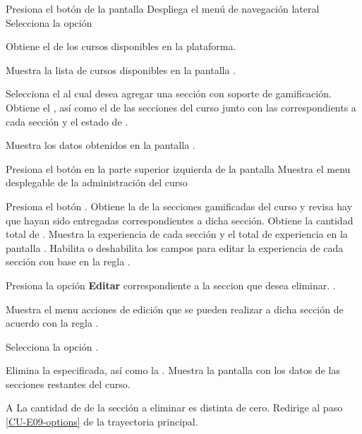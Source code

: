 \begin{UCtrayectoria}%
%
  \Actor Presiona el botón \IUMenu de la pantalla 
  \Sistema Despliega el menú de navegación lateral
  \Actor Selecciona la opción 

  \Sistema Obtiene el  de los cursos disponibles en la
           plataforma.

  \Sistema Muestra la lista de cursos disponibles en la pantalla .

  \Actor Selecciona el  al cual desea agregar una sección con
         soporte de gamificación.
  \Sistema Obtiene el , 
           así como el  de las secciones 
           del curso junto con las  
           correspondients a cada sección y el estado de .

  \Sistema Muestra los datos obtenidos en la pantalla .
           \label{CU-E07-pantalla}

  \Actor Presiona el botón \IUAdminSitio en la parte superior izquierda de la pantalla
  \Sistema Muestra el menu desplegable de la administración del curso

  \Actor Presiona el botón . 
  \Sistema Obtiene la  de la secciones gamificadas del 
           curso y revisa hay  que hayan sido
           entregadas correspondientes a dicha sección.
  \Sistema Obtiene la cantidad total de .
  \Sistema Muestra la experiencia de cada sección y el total de experiencia 
           en la pantalla .
  \Sistema Habilita o deshabilita los campos para editar la experiencia de cada 
           sección con base en la regla .

  \Actor Presiona la opción {\bf Editar} correspondiente a la 
         seccion que desea eliminar. \label{CU-E09-options}.

  \Sistema Muestra el menu acciones de edición que se pueden realizar a dicha sección de
           acuerdo con la regla .  

  \Actor Selecciona la opción .

  \Sistema Elimina la  especificada, así como la
           .
  \Sistema Muestra la pantalla  con los datos de las secciones restantes
           del curso.

\end{UCtrayectoria}

\begin{UCtrayectoriaA}{A}{%
La cantidad de  de la sección a eliminar es distinta de cero.
}
  \Sistema Redirige al paso \ref{CU-E09-options} de la trayectoria principal.
\end{UCtrayectoriaA}

